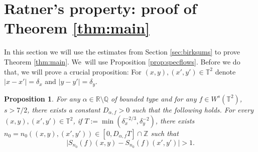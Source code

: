 \documentclass[JEP,XML,SOM,Unicode,NoEqCountersInSection]{cedram}
\theoremstyle{definition}
\theoremstyle{plain}
\newtheorem{proposition}[definition]{Proposition}
\newcommand\QQ{\mathbb{Q}}
\newcommand\RR{\mathbb{R}}
\newcommand\TT{\mathbb{T}}
\newcommand\ZZ{\mathbb{Z}}
\begin{document}
\section{Ratner's property: proof of Theorem \ref{thm:main}}\label{sec:proof}
In this section we will use the estimates from Section \ref{sec:birksums} to prove Theorem \ref{thm:main}. We~will use Proposition \ref{prop:specflows}. Before we do that, we will prove a crucial proposition:
For $(x,y),(x',y')\in \TT^2$ denote $\vert x-x'\vert =\delta_x$ and $\vert y-y'\vert =\delta_y$.
\begin{proposition}\label{prop:split} For any $\alpha\in \RR\setminus \QQ$ of bounded type and for any $f\in W^s(\TT^2)$, $s>7/2$, there exists a constant $D_{\alpha,f}>0$ such that the following holds. For every $(x,y),(x',y')\in \TT^2$, if $T:=\min(\delta_x^{-2/3}, \delta_y^{-2})$, there exists $n_0=n_0((x,y),(x',y'))\in [0,D_{\alpha,f}T]\cap \ZZ$ such that
\begin{equation}\label{eq:drift}
\bigl|S_{n_0}(f)(x,y)-S_{n_0}(f)(x',y')\bigr|>1.
\end{equation}
\end{proposition}
\end{document}
